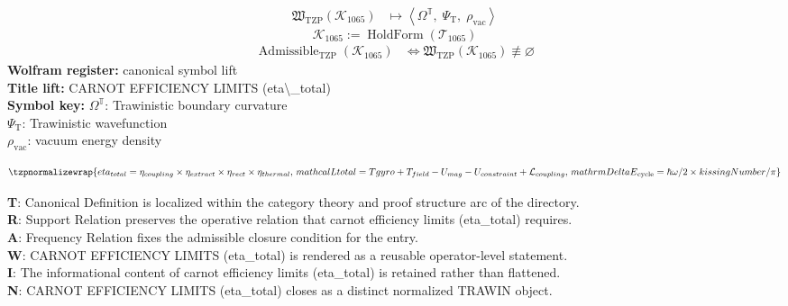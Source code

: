 \noindent
\begin{minipage}[t]{0.48\linewidth}
\begingroup
\small
\[
\begin{aligned}
\mathfrak{W}_{\mathrm{TZP}}\!\left(\mathcal{K}_{1065}\right)
&\longmapsto
\left\langle \Omega^{\mathbb{T}},\; \Psi_{\mathrm{T}},\; \rho_{\mathrm{vac}} \right\rangle
\end{aligned}
\]
\[
\mathcal{K}_{1065}
:=
\operatorname{HoldForm}\!\left(\mathcal{T}_{1065}\right)
\]
\[
\begin{aligned}
\operatorname{Admissible}_{\mathrm{TZP}}\!\left(\mathcal{K}_{1065}\right)
&\Longleftrightarrow
\mathfrak{W}_{\mathrm{TZP}}\!\left(\mathcal{K}_{1065}\right)\not\equiv\varnothing
\end{aligned}
\]
\textbf{Wolfram register:} canonical symbol lift\\
\textbf{Title lift:} CARNOT EFFICIENCY LIMITS (eta\textbackslash{}\_total)\\
\textbf{Symbol key:} \(\Omega^{\mathbb{T}}\): Trawinistic boundary curvature\\ \(\Psi_{\mathrm{T}}\): Trawinistic wavefunction\\ \(\rho_{\mathrm{vac}}\): vacuum energy density
\par
\endgroup
\end{minipage}\hfill
\begin{minipage}[t]{0.48\linewidth}
\[
\tzpnormalizewrap{eta_{total} = \eta_{coupling} \times \eta_{extract} \times \eta_{rect} \times \eta_{thermal},\,mathcal{L} {total} = T {gyro} + T_{field} - U_{mag} - U_{constraint} + \mathcal{L}_{coupling},\,mathrm{DeltaE}_{\mathrm{cycle}} = \hbar\omega/2 \times kissingNumber/\pi}
\]

\small
\textbf{T}: Canonical Definition is localized within the category theory and proof structure arc of the directory.\\
\textbf{R}: Support Relation preserves the operative relation that carnot efficiency limits (eta\_total) requires.\\
\textbf{A}: Frequency Relation fixes the admissible closure condition for the entry.\\
\textbf{W}: CARNOT EFFICIENCY LIMITS (eta\_total) is rendered as a reusable operator-level statement.\\
\textbf{I}: The informational content of carnot efficiency limits (eta\_total) is retained rather than flattened.\\
\textbf{N}: CARNOT EFFICIENCY LIMITS (eta\_total) closes as a distinct normalized TRAWIN object.
\normalsize
\end{minipage}

